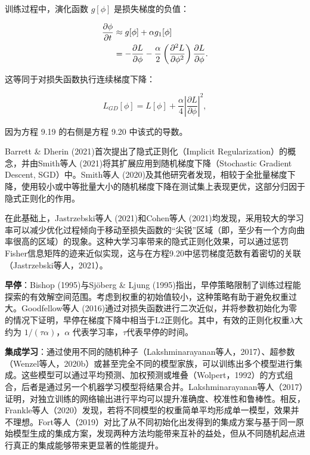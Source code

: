 训练过程中，演化函数 \(g[\phi]\) 是损失梯度的负值：


\begin{align}
	\frac{\partial \phi}{\partial t} &\approx g[\phi] + \alpha g_1[\phi] \notag \\
	&= -\frac{\partial L}{\partial \phi} - \frac{\alpha}{2} \left( \frac{\partial^2 L}{\partial \phi^2} \right) \frac{\partial L}{\partial \phi}. 
\end{align} 


这等同于对损失函数执行连续梯度下降：

\begin{equation}
L_{GD}[\phi] = L[\phi] + \frac{\alpha}{4} \left| \frac{\partial L}{\partial \phi} \right|^2 , 
\end{equation}

因为方程 9.19 的右侧是方程 9.20 中该式的导数。

Barrett \& Dherin (2021)首次提出了隐式正则化（Implicit Regularization）的概念，并由Smith等人 (2021)将其扩展应用到随机梯度下降（Stochastic Gradient Descent, SGD）中。Smith等人 (2020)及其他研究者发现，相较于全批量梯度下降，使用较小或中等批量大小的随机梯度下降在测试集上表现更优，这部分归因于隐式正则化的作用。

在此基础上，Jastrzebski等人 (2021)和Cohen等人 (2021)均发现，采用较大的学习率可以减少优化过程倾向于移动至损失函数的“尖锐”区域（即，至少有一个方向曲率很高的区域）的现象。这种大学习率带来的隐式正则化效果，可以通过惩罚Fisher信息矩阵的迹来近似实现，这与在方程9.20中惩罚梯度范数有着密切的关联（Jastrzebski等人，2021）。

\textbf{早停}：Bishop (1995)与Sjöberg \& Ljung (1995)指出，早停策略限制了训练过程能探索的有效解空间范围。考虑到权重的初始值较小，这种策略有助于避免权重过大。Goodfellow等人 (2016)通过对损失函数进行二次近似，并将参数初始化为零的情况下证明，早停在梯度下降中相当于L2正则化。其中，有效的正则化权重\(\lambda\)大约为 \(1/(\tau\alpha)\)，\(\alpha\) 代表学习率，\(\tau\)代表早停的时间。

\textbf{集成学习}：通过使用不同的随机种子（Lakshminarayanan等人，2017）、超参数（Wenzel等人，2020b）或甚至完全不同的模型家族，可以训练出多个模型进行集成。这些模型可以通过平均预测、加权预测或堆叠（Wolpert，1992）的方式组合，后者是通过另一个机器学习模型将结果合并。Lakshminarayanan等人（2017）证明，对独立训练的网络输出进行平均可以提升准确度、校准性和鲁棒性。相反，Frankle等人（2020）发现，若将不同模型的权重简单平均形成单一模型，效果并不理想。Fort等人（2019）对比了从不同初始化出发得到的集成方案与基于同一原始模型生成的集成方案，发现两种方法均能带来互补的益处，但从不同随机起点进行真正的集成能够带来更显著的性能提升。

